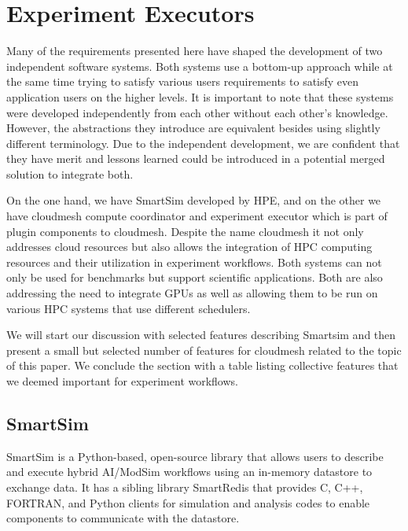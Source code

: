 \documentclass[utf8]{FrontiersinVancouver} %
\begin{document}
\section{Experiment Executors}
\label{sec:executors}

Many of the requirements presented here have shaped the development of two independent software systems. Both systems use a bottom-up approach while at the same time trying to satisfy various users requirements to satisfy even application users on the higher levels. 
It is important to note that these systems were developed independently from each other without each other's knowledge. However, the abstractions they introduce are equivalent besides using slightly different terminology. Due to the independent development, we are confident that they have merit and lessons learned could be introduced in a potential merged solution to integrate both.

On the one hand, we have SmartSim developed by HPE, and on the other we have cloudmesh compute coordinator and experiment executor which is part of plugin components to cloudmesh. Despite the name cloudmesh it not only addresses cloud resources but also allows the integration of HPC computing resources and their utilization in experiment workflows. Both systems can not only be used for benchmarks but support scientific applications. Both are also addressing the need to integrate GPUs as well as allowing them to be run on various HPC systems that use different schedulers. 

We will start our discussion with selected features describing Smartsim and then present a small but selected number of features for cloudmesh related to the topic of this paper. We conclude the section with a table listing collective features that we deemed important for experiment workflows.

\subsection{SmartSim}
\label{sec:smartsim}

SmartSim is a Python-based, open-source library that allows users to describe and execute hybrid AI/ModSim workflows using an in-memory datastore to exchange data. It has a sibling library SmartRedis that provides C, C++, FORTRAN, and  Python clients for simulation and analysis codes to enable components to communicate with the datastore.
\end{document}
